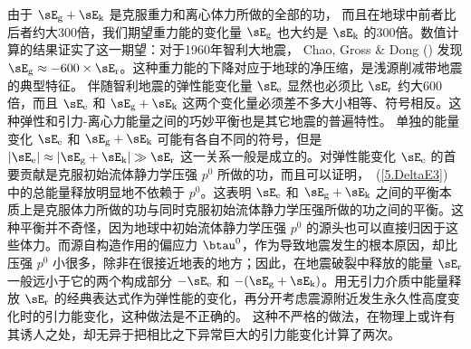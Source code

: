 由于 $\sE_{\rm g}+\sE_{\rm k}$ 是克服重力和离心体力所做的全部的功，
%
%
%
%
%
而且在地球中前者比后者约大300倍，我们期望重力能的变化量
$\sE_{\rm g}$ 也大约是 $\sE_{\rm k}$ 的300倍。数值计算的结果证实了这一期望：对于1960年智利大地震，
Chao, Gross \& Dong (\citeyear{chao&al95})
发现 $\sE_{\rm g}\approx -600\times\sE_{\rm r}$。这种重力能的下降对应于地球的净压缩，是浅源削减带地震的典型特征。
伴随智利地震的弹性能变化量 $\sE_{\rm e}$ 显然也必须比 $\sE_{\rm r}$ 约大600倍，而且 $\sE_{\rm e}$ 和 $\sE_{\rm g}+\sE_{\rm k}$ 这两个变化量必须差不多大小相等、符号相反。这种弹性和引力-离心力能量之间的巧妙平衡也是其它地震的普遍特性。
%
%
单独的能量变化 $\sE_{\rm e}$ 和 $\sE_{\rm g}+\sE_{\rm k}$ 可能有各自不同的符号，但是
$|\sE_{\rm e}|\approx|\sE_{\rm g}+\sE_{\rm k}|\gg\sE_{\rm r}$ 这一关系一般是成立的。对弹性能变化
$\sE_{\rm e}$ 的首要贡献是克服初始流体静力学压强 $p^0$ 所做的功，而且可以证明，~(\ref{5.DeltaE3}) 中的总能量释放明显地不依赖于 $p^0$。这表明 $\sE_{\rm e}$ 和 $\sE_{\rm g}+\sE_{\rm k}$ 之间的平衡本质上是克服体力所做的功与同时克服初始流体静力学压强所做的功之间的平衡。这种平衡并不奇怪，因为地球中初始流体静力学压强
$p^0$ 的源头也可以直接归因于这些体力。而源自构造作用的偏应力
$\btau^0$，作为导致地震发生的根本原因，却比压强 $p^0$ 小很多，除非在很接近地表的地方；因此，在地震破裂中释放的能量
$\sE_{\rm r}$ 一般远小于它的两个构成部分
$-\sE_{\rm e}$ 和 $-(\sE_{\rm g}+\sE_{\rm k})$。用无引力介质中能量释放 $\sE_{\rm r}$ 的经典表达式作为弹性能的变化，再分开考虑震源附近发生永久性高度变化时的引力能变化，这种做法是不正确的。
这种不严格的做法，在物理上或许有其诱人之处，却无异于把相比之下异常巨大的引力能变化计算了两次。
%
%
